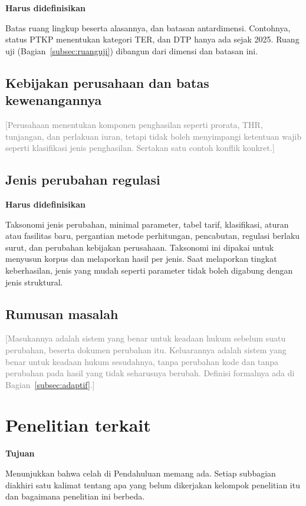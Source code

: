 \documentclass[journal,a4paper]{IEEEtran}
\newif\ifrancangan \rancangantrue
\newcommand{\kotak}[3]{\ifrancangan\par\begingroup\scriptsize
  \def\FrameCommand{\fboxsep=3pt\fboxrule=0.4pt\fcolorbox{#1!60!black}{#1!6}}%
  \MakeFramed{\advance\hsize-\width\FrameRestore}\noindent\textbf{#2}\par #3\endMakeFramed\endgroup\fi}
\newcommand{\tujuan}[1]{\kotak{blue}{Tujuan}{#1}}
\newcommand{\definisikan}[1]{\kotak{teal}{Harus didefinisikan}{#1}}
\newcommand{\isian}[1]{\ifrancangan\textcolor{gray}{[#1]}\fi}
\begin{document}
\definisikan{Batas ruang lingkup beserta alasannya, dan batasan antardimensi. Contohnya, status PTKP menentukan kategori TER, dan DTP hanya ada sejak 2025. Ruang uji (Bagian~\ref{subsec:ruanguji}) dibangun dari dimensi dan batasan ini.}

\subsection{Kebijakan perusahaan dan batas kewenangannya}
\isian{Perusahaan menentukan komponen penghasilan seperti prorata, THR, tunjangan, dan perlakuan iuran, tetapi tidak boleh menyimpangi ketentuan wajib seperti klasifikasi jenis penghasilan. Sertakan satu contoh konflik konkret.}

\subsection{Jenis perubahan regulasi}
\label{subsec:jenis-perubahan}
\definisikan{Taksonomi jenis perubahan, minimal parameter, tabel tarif, klasifikasi, aturan atau fasilitas baru, pergantian metode perhitungan, pencabutan, regulasi berlaku surut, dan perubahan kebijakan perusahaan. Taksonomi ini dipakai untuk menyusun korpus dan melaporkan hasil per jenis. Saat melaporkan tingkat keberhasilan, jenis yang mudah seperti parameter tidak boleh digabung dengan jenis struktural.}

\subsection{Rumusan masalah}
\isian{Masukannya adalah sistem yang benar untuk keadaan hukum sebelum suatu perubahan, beserta dokumen perubahan itu. Keluarannya adalah sistem yang benar untuk keadaan hukum sesudahnya, tanpa perubahan kode dan tanpa perubahan pada hasil yang tidak seharusnya berubah. Definisi formalnya ada di Bagian~\ref{subsec:adaptif}.}

\section{Penelitian terkait}
\label{sec:terkait}
\tujuan{Menunjukkan bahwa celah di Pendahuluan memang ada. Setiap subbagian diakhiri satu kalimat tentang apa yang belum dikerjakan kelompok penelitian itu dan bagaimana penelitian ini berbeda.}
\end{document}
